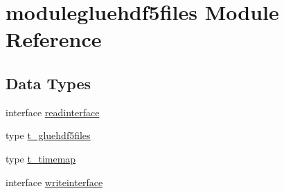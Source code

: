 \hypertarget{namespacemodulegluehdf5files}{}\section{modulegluehdf5files Module Reference}
\label{namespacemodulegluehdf5files}
\subsection*{Data Types}
\begin{DoxyCompactItemize}
\item 
interface \mbox{\hyperlink{interfacemodulegluehdf5files_1_1readinterface}{readinterface}}
\item 
type \mbox{\hyperlink{structmodulegluehdf5files_1_1t__gluehdf5files}{t\+\_\+gluehdf5files}}
\item 
type \mbox{\hyperlink{structmodulegluehdf5files_1_1t__timemap}{t\+\_\+timemap}}
\item 
interface \mbox{\hyperlink{interfacemodulegluehdf5files_1_1writeinterface}{writeinterface}}
\end{DoxyCompactItemize}
